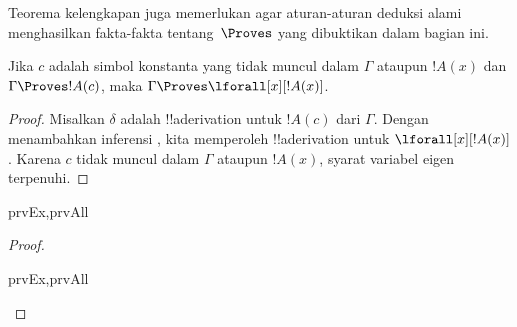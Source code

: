 \documentclass[../../../include/open-logic-section]{subfiles}
\begin{document}


\begin{explain}
  Teorema kelengkapan juga memerlukan agar aturan-aturan deduksi alami
  menghasilkan fakta-fakta tentang~$\Proves$ yang dibuktikan dalam
  bagian ini.
\end{explain}

\begin{thm}
 Jika $c$ adalah simbol konstanta yang
tidak muncul dalam $\Gamma$ ataupun $!A(x)$ dan $\Gamma \Proves !A(c)$,
maka $\Gamma \Proves \lforall[x][!A(x)]$.
\end{thm}

\begin{proof}
Misalkan $\delta$ adalah !!a{derivation} untuk $!A(c)$ dari $\Gamma$.
Dengan menambahkan inferensi \Intro{\lforall}, kita memperoleh
!!a{derivation} untuk $\lforall[x][!A(x)]$. Karena $c$ tidak muncul dalam
$\Gamma$ ataupun $!A(x)$, syarat variabel eigen terpenuhi.
\end{proof}

\begin{prop}
\begin{tagenumerate}{prvEx,prvAll}

\end{tagenumerate}
\end{prop}

\begin{proof}
\begin{tagenumerate}{prvEx,prvAll}

\end{tagenumerate}
\end{proof}
\end{document}
